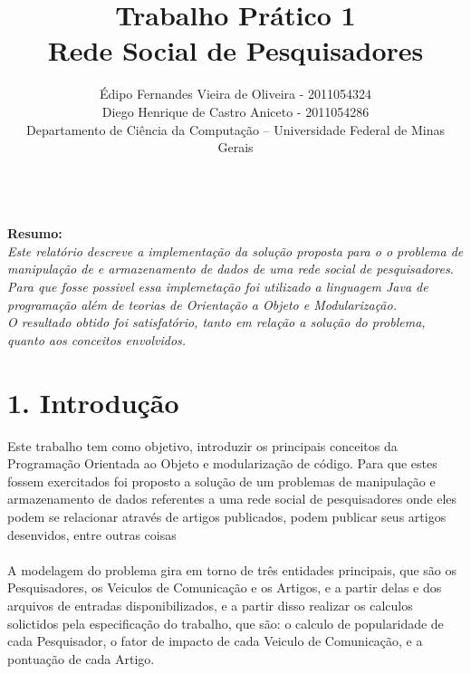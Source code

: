 \documentclass[12pt, a4paper]{article}
\begin{document}

 \title{Trabalho Prático 1 \\ Rede Social de Pesquisadores \\}
 \author{Édipo Fernandes Vieira de Oliveira - 2011054324\\ Diego Henrique de Castro Aniceto - 2011054286\\Departamento de Ciência da Computação -- Universidade Federal de Minas Gerais\\}
  \maketitle


\textbf{\textit \\Resumo: }
\textit{\\ Este relatório descreve a implementação da solução proposta para o o problema de manipulação de e armazenamento de dados de uma rede social de pesquisadores. Para que fosse possivel essa implemetação foi utilizado a linguagem Java de programação além de teorias de Orientação a Objeto e Modularização.\\
  O resultado obtido foi satisfatório, tanto em relação a solução do problema, quanto aos conceitos envolvidos.}
\section*{1. Introdução}

  Este trabalho tem como objetivo, introduzir os principais conceitos da Programação Orientada ao Objeto e modularização de código. Para que estes fossem exercitados foi proposto a solução de um problemas de manipulação e armazenamento de dados referentes a uma rede social de pesquisadores onde eles podem se relacionar através de artigos publicados, podem publicar seus artigos desenvidos, entre outras coisas \\\\
  A modelagem do problema gira em torno de três entidades principais, que são os Pesquisadores, os Veiculos de Comunicação e os Artigos, e a partir delas e dos arquivos de entradas disponibilizados, e a partir disso realizar os calculos solictidos pela especificação do trabalho, que são: o calculo de popularidade de cada Pesquisador, o fator de impacto de cada Veiculo de Comunicação, e a pontuação de cada Artigo.\\\\
\end{document}
